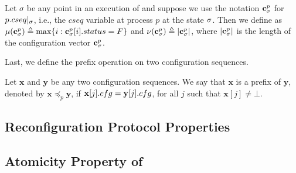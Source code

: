 	\begin{definition}
		Let $\sigma$ be any point in an execution of \ares{} and suppose we use the notation $\mathbf{c}^{p}_{\sigma}$ for $ p.cseq|_{\sigma}$,  i.e., the $cseq$ variable at process $p$ at the state $\sigma$. %
		Then we define as $ \mu(\mathbf{c}^{p}_{\sigma})  \triangleq  \max\{ i : \mathbf{c}^{p}_{\sigma}[i].status = F\}$ 
		and $ \nu(\mathbf{c}^{p}_{\sigma}) \triangleq |\mathbf{c}^{p}_{\sigma}|$, where $|\mathbf{c}^{p}_{\sigma}|$ is the length of the  configuration vector 
		$\mathbf{c}^{p}_{\sigma}$. %
	\end{definition}
	
	Last, we define the prefix operation on two configuration sequences. 
	
	\begin{definition} 
		Let $\mathbf{x}$ and $\mathbf{y}$ be any two configuration sequences. We say that $\mathbf{x}$ is a prefix of $\mathbf{y}$, denoted by 
		$\mathbf{x} \preceq_p  \mathbf{y}$, if $\mathbf{x}[j].cfg=\mathbf{y}[j].cfg$, for all $j$ such that $\mathbf{x}[j]\neq\bot$.
	\end{definition}

% 

\subsection{Reconfiguration Protocol Properties}
\label{sec:safety:recon}


\subsection{Atomicity  Property of \ares{}}
\label{sec:safety:atomic}
